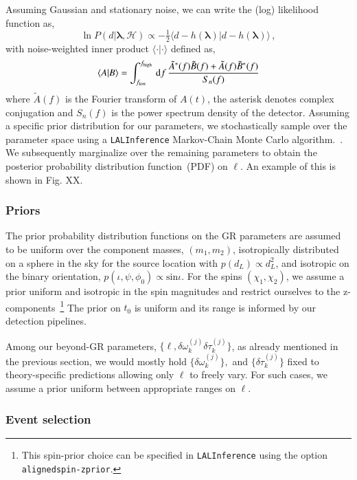 \documentclass[twocolumn,prd,aps,superscriptaddress,preprintnumbers,tightenlines,showpacs,nofootinbib,eqsecnum,amsfonts,amsmath,longbibliography]{revtex4-1}
\newcommand{\dd}{{\rm d}}
\begin{document}
Assuming Gaussian and stationary noise, we can write the (log) likelihood function as,
%
\begin{equation}
\ln P(d \vert \bm{\lambda},\mathcal{H}) \propto
- \tfrac{1}{2}
\langle
d - h(\bm{\lambda}) \vert d - h(\bm{\lambda})
\rangle\,,
\end{equation}
%
with noise-weighted inner product $\langle \cdot | \cdot \rangle$ defined as,
%
\begin{equation}
\langle A | B \rangle =
\int_{f_{\rm low}}^{f_{\rm high}} \, \dd f \,
\frac{\tilde{A}^{\ast}(f) \tilde{B}(f) + \tilde{A}(f) \tilde{B}^{\ast}(f)}{S_{n}(f)}
\end{equation}
%
where $\tilde{A}(f)$ is the Fourier transform of $A(t)$, the asterisk denotes
complex conjugation and $S_{n}(f)$ is the power spectrum density of the
detector.
%
Assuming a specific prior distribution for our parameters, we stochastically
sample over the parameter space using a \texttt{LALInference} Markov-Chain
Monte Carlo algorithm.~\cite{lalsuite}. We subsequently marginalize over the
remaining parameters to obtain the posterior probability distribution
function~(PDF) on $\ell$. An example of this is shown in Fig. XX.

\subsubsection{Priors}

The prior probability distribution functions on the GR parameters are assumed to be uniform over the component masses, $(m_1, m_2)$, isotropically distributed on a sphere in the sky for the source location with $p(d_L) \propto d_L^2$, and isotropic on the binary orientation, $p(\iota, \psi, \phi_0) \propto \text{sin} \iota$. For the spins $(\chi_1, \chi_2)$, we assume a prior uniform and isotropic in the spin magnitudes and restrict ourselves to the z-components~\footnote{This spin-prior choice can be specified in \texttt{LALInference} using the option \texttt{alignedspin-zprior}.} The prior on $t_0$ is uniform and its range is informed by our detection pipelines.

Among our beyond-GR parameters, $\{\ell, \delta \omega_k^{(j)}\delta \tau_k^{(j)}\}$, as already mentioned in the previous section, we would mostly hold $\{\delta \omega_k^{(j)}\},$ and $\{\delta \tau_k^{(j)}\}$ fixed to theory-specific predictions allowing only $\ell$ to freely vary. For such cases, we assume a prior uniform between appropriate ranges on $\ell$.


\subsubsection{Event selection}
\end{document}
